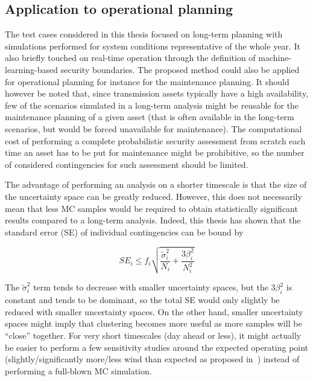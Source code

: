 
\subsection*{Application to operational planning}

The test cases considered in this thesis focused on long-term planning with simulations performed for system conditions representative of the whole year. It also briefly touched on real-time operation through the definition of machine-learning-based security boundaries. The proposed method could also be applied for operational planning for instance for the maintenance planning. It should however be noted that, since transmission assets typically have a high availability, few of the scenarios simulated in a long-term analysis might be reusable for the maintenance planning of a given asset (that is often available in the long-term scenarios, but would be forced unavailable for maintenance). The computational cost of performing a complete probabilistic security assessment from scratch each time an asset has to be put for maintenance might be prohibitive, so the number of considered contingencies for such assessment should be limited.

The advantage of performing an analysis on a shorter timescale is that the size of the uncertainty space can be greatly reduced. However, this does not necessarily mean that less MC samples would be required to obtain statistically significant results compared to a long-term analysis. Indeed, this thesis has shown that the standard error (SE) of individual contingencies can be bound by

\begin{equation}
\label{eq:SE_bound_repeated}
SE_i \leq f_i \sqrt{\frac{\tilde{\sigma}_i^2}{N_i} + \frac{3 \beta_i^2}{N_i^2}}
\end{equation}

The \(\tilde{\sigma}_i^2\) term tends to decrease with smaller uncertainty spaces, but the \(3 \beta_i^2\) is constant and tends to be dominant, so the total SE would only slightly be reduced with smaller uncertainty spaces. On the other hand, smaller uncertainty spaces might imply that clustering becomes more useful as more samples will be ``close'' together. For very short timescales (day ahead or less), it might actually be easier to perform a few sensitivity studies around the expected operating point (\eg slightly/significantly more/less wind than expected as proposed in~\cite{Gamze_DIFERS}) instead of performing a full-blown MC simulation.


